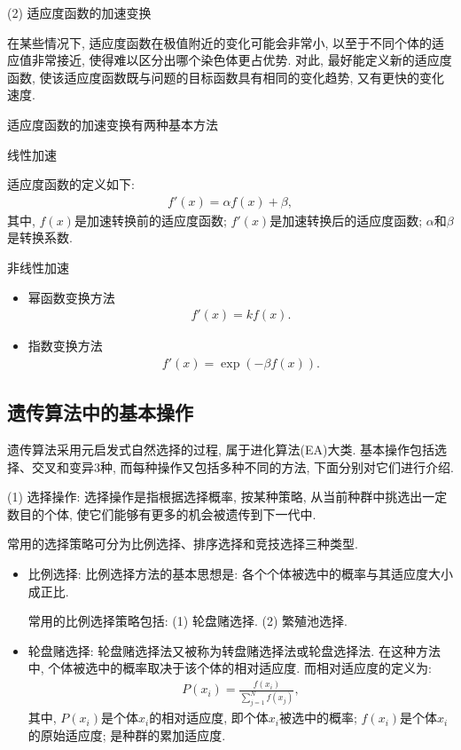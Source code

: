 (2) 适应度函数的加速变换

在某些情况下, 适应度函数在极值附近的变化可能会非常小, 以至于不同个体的适应值非常接近, 使得难以区分出哪个染色体更占优势.
对此, 最好能定义新的适应度函数, 使该适应度函数既与问题的目标函数具有相同的变化趋势, 又有更快的变化速度.

适应度函数的加速变换有两种基本方法

 线性加速

适应度函数的定义如下:
\begin{align}
    f'(x)=\alpha f(x)+\beta,
\end{align}
其中, $f(x)$是加速转换前的适应度函数; $f'(x)$是加速转换后的适应度函数;  $\alpha$和$\beta$是转换系数.

  非线性加速
\begin{itemize}
\item 幂函数变换方法
   \begin{align}
        f'(x)=k f(x).
   \end{align}
\item 指数变换方法
         \begin{align}
            f'(x)=\exp(-\beta f(x)).
         \end{align}
\end{itemize}
\subsection{遗传算法中的基本操作}
遗传算法采用元启发式自然选择的过程, 属于进化算法(EA)大类. 基本操作包括选择、交叉和变异3种, 而每种操作又包括多种不同的方法, 下面分别对它们进行介绍.

(1) 选择操作: 选择操作是指根据选择概率, 按某种策略, 从当前种群中挑选出一定数目的个体, 使它们能够有更多的机会被遗传到下一代中.

常用的选择策略可分为比例选择、排序选择和竞技选择三种类型.
\begin{itemize}
\item 比例选择: 比例选择方法的基本思想是: 各个个体被选中的概率与其适应度大小成正比.

     常用的比例选择策略包括: (1) 轮盘赌选择. (2) 繁殖池选择.

\item 轮盘赌选择: 轮盘赌选择法又被称为转盘赌选择法或轮盘选择法. 在这种方法中, 个体被选中的概率取决于该个体的相对适应度. 而相对适应度的定义为:
\begin{align}
    P\left(x_{i}\right)=\frac{f\left(x_{i}\right)}{\sum_{j=1}^{N} f\left(x_{j}\right)},
\end{align}
其中, $P(x_i)$是个体$x_i$的相对适应度, 即个体$x_i$被选中的概率; $f(x_i)$是个体$x_i$的原始适应度; 是种群的累加适应度.
\end{itemize}

